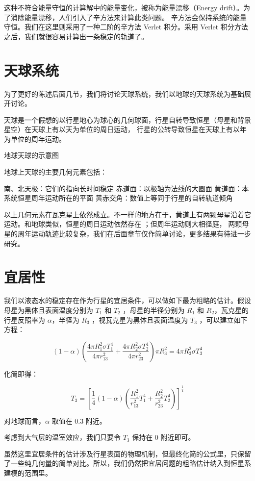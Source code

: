 \documentclass[a4paper,10.5pt]{book}
\begin{document}
这种不符合能量守恒的计算解中的能量变化，被称为能量漂移（Energy drift）。为了消除能量漂移，人们引入了辛方法来计算此类问题。
辛方法会保持系统的能量守恒。我们在这里则采用了一种二阶的辛方法 Verlet 积分。采用 Verlet 积分方法之后，我们就很容易计算出一条稳定的轨道了。

\section{天球系统}

为了更好的陈述后面几节，我们将讨论天球系统，我们以地球的天球系统为基础展开讨论。

天球是一个假想的以行星地心为球心的几何球面，行星自转导致恒星（母星和背景星空）在天球上有以天为单位的周日运动，
行星的公转导致恒星在天球上有以年为单位的周年运动。

地球天球的示意图

地球上天球的主要几何元素包括：

南、北天极：它们的指向长时间稳定
赤道面：以极轴为法线的大圆面
黄道面：本系统恒星周年运动所在的平面
黄赤交角：数值上等同于行星的自转轨道倾角

以上几何元素在瓦克星上依然成立。不一样的地方在于，黄道上有两颗母星沿着它运动。和地球类似，恒星的周日运动依然存在 ；但周年运动则大相径庭，
两颗母星的周年运动轨迹比较复杂，我们在后面章节仅作简单讨论，更多结果有待进一步研究。

\section{宜居性}

我们以液态水的稳定存在作为行星的宜居条件，可以做如下最为粗略的估计。假设母星为黑体且表面温度分别为 $T_1$ 和 $T_2$ ，母星的半径分别为 $R_1$ 和 $R_2$，瓦克星的行星反照率为 $\alpha$，半径为 $R_3$ ，视瓦克星为黑体且表面温度为 $T_3$  ，可以建立如下方程：

$$\left ( 1 - \alpha \right ) \left(  \frac{4 \pi R_1^2 \sigma T_1^4} {4 \pi r_{13}^2} + \frac{4 \pi R_2^2 \sigma T_2^4} {4 \pi r_{23}^2} \right ) \pi R_3^2= 4 \pi R_3^2 \sigma T_3^4$$

化简即得：

$$T_3 = \left[ \frac{1}{4} \left( 1 - \alpha \right ) \left( \frac{R_1^2}{r_{13}^2} T_1^4 + \frac{R_2^2}{r_{23}^2} T_2^4 \right ) \right ]^{\frac{1}{4}}$$

对地球而言，$\alpha$ 取值在 0.3 附近。

考虑到大气层的温室效应，我们只要令 $T_3$ 保持在 0 附近即可。

虽然这里宜居条件的估计涉及行星表面的物理机制，但最终化简的公式里，只保留了一些纯几何量的简单对比。所以，我们仍然把宜居问题的粗略估计纳入到恒星系建模的范围里。
\end{document}
